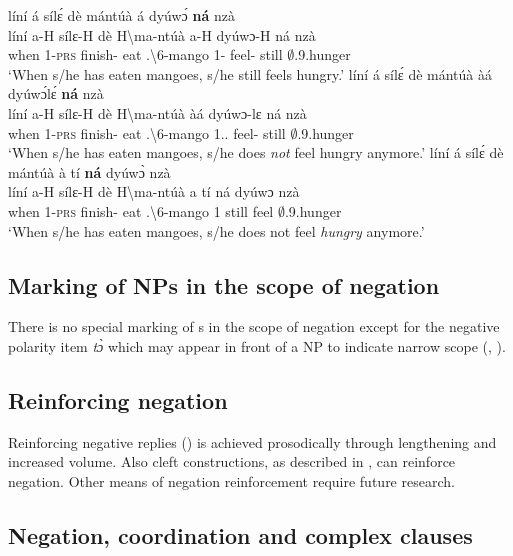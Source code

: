 \documentclass[output=paper,colorlinks=true, citecolor=brown,draftmode]{langscibook}
\begin{document}
\ea\label{na}
\ea\label{na1}
  \glll   líní á sílɛ́ dè mántúà á dyúwɔ́ {\bfseries ná} nzà \\
líní a-H sílɛ-H dè {H\backslash{}ma-ntúà} a-H dyúwɔ-H ná nzà  \\
when 1-\textsc{prs} finish-{\R} eat {{\OBJ}.{\LINK}\backslash{}6-mango} 1-{\PRS} feel-{\R} still $\emptyset$.9.hunger\\
    \trans `When s/he has eaten mangoes, s/he still feels hungry.' 
\ex\label{na2}
  \glll   líní á sílɛ́ dè mántúà àá dyúwɔ́lɛ́ {\bfseries ná} nzà \\
líní a-H sílɛ-H dè {H\backslash{}ma-ntúà} àá dyúwɔ-lɛ ná nzà  \\
when 1-\textsc{prs} finish-{\R} eat {{\OBJ}.{\LINK}\backslash{}6-mango} 1.{\PRS}.{\NEG} feel-{\NEG} still $\emptyset$.9.hunger\\
    \trans `When s/he has eaten mangoes, s/he does \textit{not} feel hungry anymore.'  %
\ex\label{na3}
  \glll   líní á sílɛ́ dè mántúà à tí {\bfseries ná} dyúwɔ̀ nzà \\
líní a-H sílɛ-H dè {H\backslash{}ma-ntúà} a tí ná dyúwɔ nzà  \\
when 1-\textsc{prs} finish-{\R} eat {{\OBJ}.{\LINK}\backslash{}6-mango} 1 {\NEG} still feel $\emptyset$.9.hunger\\
    \trans `When s/he has eaten mangoes, s/he does not feel \textit{hungry} anymore.'
\z
\z

\subsection{Marking of {NP}s in the scope of negation}
There is no special marking of {\NP}s in the scope of negation except for the negative polarity item  {\itshape tɔ̀} which may appear in front of a NP to indicate narrow scope (, ). 

\subsection{Reinforcing negation}

Reinforcing negative replies () is achieved prosodically through lengthening and increased volume. Also cleft constructions, as described in , can reinforce negation.  Other means of negation reinforcement require future research. 

\subsection{Negation, coordination and complex clauses}
\label{sec:gye:Coord}
\end{document}
